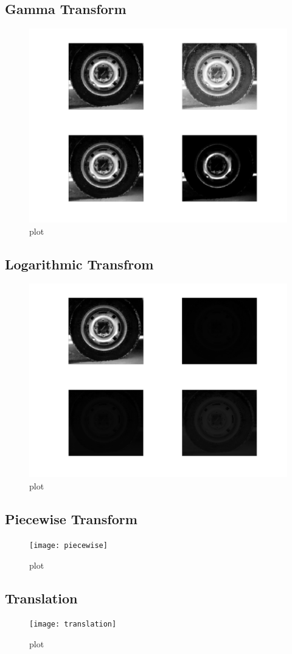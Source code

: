 \subsection{Gamma Transform}

\begin{figure}[H]
    \centering
    \includegraphics{tire_gamma}
    \caption{plot}
\end{figure}

\subsection{Logarithmic Transfrom}

\begin{figure}[H]
    \centering
    \includegraphics{tire_log}
    \caption{plot}
\end{figure}

\subsection{Piecewise Transform}

\begin{figure}[H]
    \centering
    \texttt{[image: piecewise]}
    \caption{plot}
\end{figure}

\subsection{Translation}

\begin{figure}[H]
    \centering
    \texttt{[image: translation]}
    \caption{plot}
\end{figure}
